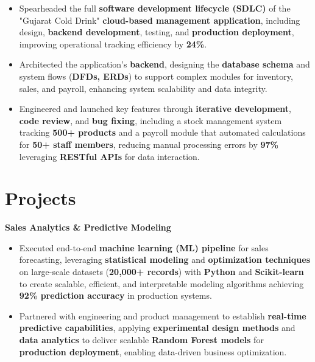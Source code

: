 \documentclass[a4paper,10pt]{article}
\begin{document}
\begin{itemize}[leftmargin=*, itemsep=0pt, parsep=1pt] %
\vspace{-7mm}
    \item Spearheaded the full \textbf{software development lifecycle (SDLC)} of the "Gujarat Cold Drink" \textbf{cloud-based management application}, including design, \textbf{backend development}, testing, and \textbf{production deployment}, improving operational tracking efficiency by \textbf{24\%}.
\item Architected the application's \textbf{backend}, designing the \textbf{database schema} and system flows (\textbf{DFDs, ERDs}) to support complex modules for inventory, sales, and payroll, enhancing system scalability and data integrity.
\item Engineered and launched key features through \textbf{iterative development}, \textbf{code review}, and \textbf{bug fixing}, including a stock management system tracking \textbf{500+ products} and a payroll module that automated calculations for \textbf{50+ staff members}, reducing manual processing errors by \textbf{97\%} leveraging \textbf{RESTful APIs} for data interaction. 

\end{itemize}

\vspace{-4mm}

\section*{Projects}
\textbf{Sales Analytics \& Predictive Modeling} \\
\begin{itemize}[leftmargin=*, itemsep=0pt, parsep=1pt]
\vspace{-7mm}
    \item Executed end-to-end \textbf{machine learning (ML) pipeline} for sales forecasting, leveraging \textbf{statistical modeling} and \textbf{optimization techniques} on large-scale datasets (\textbf{20,000+ records}) with \textbf{Python} and \textbf{Scikit-learn} to create scalable, efficient, and interpretable modeling algorithms achieving \textbf{92\% prediction accuracy} in production systems.
    \item Partnered with engineering and product management to establish \textbf{real-time predictive capabilities}, applying \textbf{experimental design methods} and \textbf{data analytics} to deliver scalable \textbf{Random Forest models} for \textbf{production deployment}, enabling data-driven business optimization.
    \end{itemize}
\end{document}
